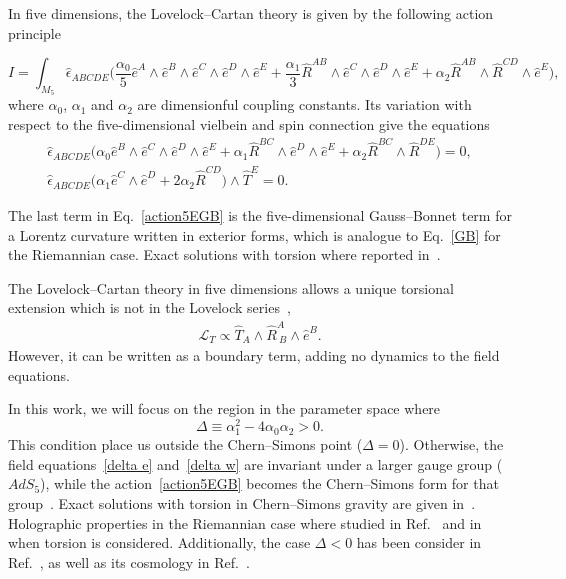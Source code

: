 \documentclass[aps,prd,12pt,superscriptaddress,showpacs,showkeys,reprint,nofootinbib]{revtex4-1}
\begin{document}
In five dimensions, the Lovelock--Cartan theory is given by the following action principle 
\begin{widetext}
  \begin{equation}
    \label{action5EGB}
    I = \int_{M_5} \hat{\epsilon}_{ABCDE} \Big(\frac{\alpha_0}{5}\hat{e}^A\wedge\hat{e}^B\wedge\hat{e}^C\wedge
    \hat{e}^D\wedge\hat{e}^E
    +\frac{\alpha_1}{3}\hat{R}^{AB}\wedge\hat{e}^C\wedge\hat{e}^D\wedge\hat{e}^E
    +\alpha_2\hat{R}^{AB}\wedge\hat{R}^{CD}
    \wedge\hat{e}^E\Big),
  \end{equation}
  where $\alpha_0$, $\alpha_1$ and $\alpha_2$ are dimensionful coupling constants. Its variation with respect to the five-dimensional vielbein and spin connection give the equations
  \begin{gather}
    \label{delta e}
    \hat{\epsilon}_{ABCDE}\Big(\alpha_0\hat{e}^B\wedge\hat{e}^C\wedge\hat{e}^D\wedge\hat{e}^E
    + \alpha_1\hat{R}^{BC}\wedge\hat{e}^D\wedge\hat{e}^E
    + \alpha_2\hat{R}^{BC}\wedge\hat{R}^{DE}\Big)=0,
    \\
    \label{delta w}
    \hat{\epsilon}_{ABCDE}\Big(\alpha_1\hat{e}^C\wedge\hat{e}^D+
    2\alpha_2\hat{R}^{CD}\Big)\wedge\hat{T}^E=0.
  \end{gather}
\end{widetext}

The last term in Eq.~\eqref{action5EGB} is the five-dimensional Gauss--Bonnet term for a Lorentz curvature written in exterior forms, which is analogue to Eq.~\eqref{GB} for the Riemannian case.
Exact solutions with torsion where reported in~\cite{Canfora:2007ux}.

The Lovelock--Cartan theory in five dimensions allows a unique torsional extension which is not in the Lovelock series~\cite{Mardones:1990qc},
\begin{align}
  \label{boundary}
  \mathcal{L}_{T} \propto \hat{T}_A\wedge \hat{R}^A_{\ B}\wedge\hat{e}^B.
\end{align}
However, it can be written as a boundary term, adding no dynamics to the field equations.

In this work, we will focus on the region in the parameter space where
\begin{equation}
  \label{delta}
  \Delta\equiv\alpha_1^2-4\alpha_0\alpha_2 > 0.
\end{equation}
This condition place us outside the Chern--Simons point ($\Delta =
0$). Otherwise, the field equations~\eqref{delta e} and~\eqref{delta
  w} are invariant under a larger gauge group ($AdS_5$), while the
action~\eqref{action5EGB} becomes the Chern--Simons form for that
group~\cite{Zanelli:2016cs,*Troncoso:1999pk}. Exact solutions with
torsion in Chern--Simons gravity are given
in~\cite{Aros:2007nn,Banados:2003cz}. Holographic properties in the
Riemannian case where studied in Ref.~\cite{Banados:2005rz} and in
\cite{Banados:2006fe} when torsion is considered. Additionally, the
case $\Delta < 0$ has been consider in Ref.~\cite{Canfora:2013xsa}, as
well as its cosmology in Ref.~\cite{Canfora:2014iga}.
\end{document}
